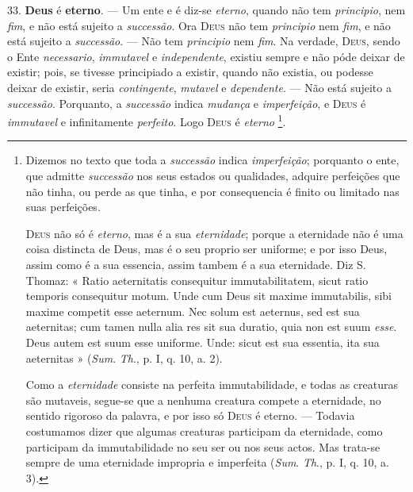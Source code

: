  33. \textbf{Deus} é \textbf{eterno}. --- Um ente e é diz-se \emph{eterno}, quando não tem \emph{principio}, nem \emph{fim}, e não está sujeito a \emph{successão}. Ora \textsc{Deus} não tem \emph{principio} nem \emph{fim}, e não está sujeito a \emph{successão}. --- Não tem \emph{principio} nem \emph{fim}. Na verdade, \textsc{Deus}, sendo o Ente \emph{necessario}, \emph{immutavel} e \emph{independente}, existiu sempre e não póde deixar de existir; pois, se tivesse principiado a existir, quando não existia, ou podesse deixar de existir, seria \emph{contingente}, \emph{mutavel} e \emph{dependente}. --- Não está sujeito a \emph{successão}. Porquanto, a \emph{successão} indica \emph{mudança} e \emph{imperfeição}, e \textsc{Deus} é \emph{immutavel} e infinitamente \emph{perfeito}. Logo \textsc{Deus} é \emph{eterno} \footnote{Dizemos no texto que toda a \emph{successão} indica \emph{imperfeição}; porquanto o ente, que admitte \emph{successão} nos seus estados ou qualidades, adquire perfeições que não tinha, ou perde as que tinha, e por consequencia é finito ou limitado nas suas perfeições.\par \textsc{Deus} não só é \emph{eterno}, mas é a sua \emph{eternidade}; porque a eternidade não é uma coisa distincta de Deus, mas é o seu proprio ser uniforme; e por isso Deus, assim como é a sua essencia, assim tambem é a sua eternidade. Diz S. Thomaz: « Ratio aeternitatis consequitur immutabilitatem, sicut ratio temporis consequitur motum. Unde cum Deus sit maxime immutabilis, sibi maxime competit esse aeternum. Nec solum est aeternus, sed est sua aeternitas; cum tamen nulla alia res sit sua duratio, quia non est suum \emph{esse}. Deus autem est suum esse uniforme. Unde: sicut est sua essentia, ita sua aeternitas » (\emph{Sum}. \emph{Th}., p. I, q. 10, a. 2).\par Como a \emph{eternidade} consiste na perfeita immutabilidade, e todas as creaturas são mutaveis, segue-se que a nenhuma creatura compete a eternidade, no sentido rigoroso da palavra, e por isso só \textsc{Deus} é eterno. --- Todavia costumamos dizer que algumas creaturas participam da eternidade, como participam da immutabilidade no seu ser ou nos seus actos. Mas trata-se sempre de uma eternidade impropria e imperfeita (\emph{Sum}. \emph{Th}., p. I, q. 10, a. 3).}.

